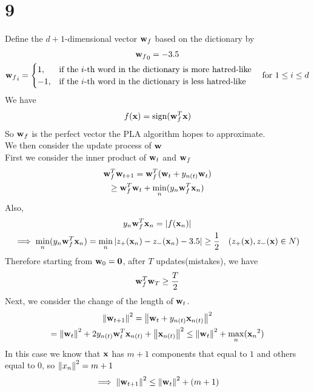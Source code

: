\documentclass[11pt]{article}
\let\mathbb\relax
\theoremstyle{definition}
\begin{document}
\section*{9}
Define the $d + 1$-dimensional vector $\vb{w}_f$ based on the dictionary by 
\begin{gather*}
  {\vb{w}_f}_0 = -3.5 \\ 
  {\vb{w}_f}_i = \begin{cases}
    1 , & \text{if the $i$-th word in the dictionary is more hatred-like}\\
    -1 , & \text{if the $i$-th word in the dictionary is less hatred-like}
  \end{cases} \quad \text{for $1 \leq i \leq d$}
\end{gather*}
We have 
\[
  f(\vb{x}) = \text{sign}(\vb{w}_f^T\vb{x})
\]
So $\vb{w}_f$ is the perfect vector the PLA algorithm hopes to approximate. \\ 
We then consider the update process of $\vb{w}$ \\ 
First we consider the inner product of $\vb{w}_t$ and $\vb{w}_f$ 
\begin{gather*}
  \vb{w}_f^T\vb{w}_{t+1} = \vb{w}_f^T(\vb{w}_t + y_{n(t)}\vb{w}_t) \\ 
  \geq \vb{w}_f^T\vb{w}_t + \min_n(y_n\vb{w}_f^T\vb{x}_n)
\end{gather*}
Also, 
\begin{gather*}
  y_n\vb{w}_f^T\vb{x}_n = \left |f(\vb{x}_n)\right| \\
  \implies \min_n(y_n\vb{w}_f^T\vb{x}_n) = \min_n\left |z_+(\vb{x}_n) - z_-(\vb{x}_n) - 3.5\right| \geq \frac{1}{2} \quad(z_+(\vb{x}), z_-(\vb{x})\in\mathbb{N})
\end{gather*}
Therefore starting from $\vb{w}_0 = \vb{0}$, after $T$ updates(mistakes), we have
\[
  \vb{w}_f^T\vb{w}_T \geq \frac{T}{2}
\]
Next, we consider the change of the length of $\vb{w}_t$. 
\begin{gather*}
  \norm{\vb{w}_{t+1}}^2 = \norm{\vb{w}_t + y_{n(t)}\vb{x}_{n(t)}}^2 \\ 
  = \norm{\vb{w}_t}^2 + 2y_{n(t)}\vb{w}_t^T\vb{x}_{n(t)} + \norm{\vb{x}_{n(t)}}^2
  \leq \norm{\vb{w}_t}^2 + \max_n({\vb{x}_n}^2)
\end{gather*}
In this case we know that $\vb{x}$ has $m + 1$ components that equal to $1$ and others equal to $0$, so $\norm{x_n}^2 = m+1$
\begin{gather*}
  \implies \norm{\vb{w}_{t+1}}^2 \leq \norm{\vb{w}_t}^2 + (m + 1)
\end{gather*}
\end{document}
